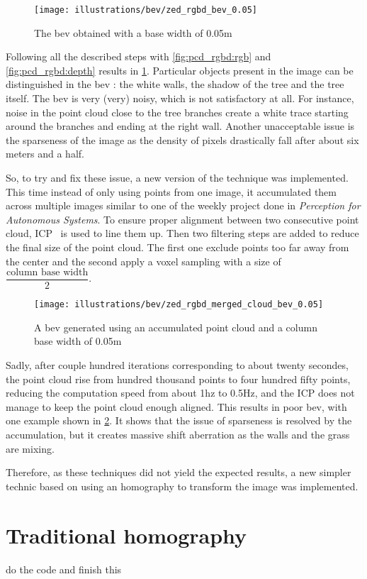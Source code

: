 \begin{figure}[ht!]
    \centering
    \texttt{[image: illustrations/bev/zed\_rgbd\_bev\_0.05]}
    \caption{The \gls{bev} obtained with a base width of 0.05m}
    \label{fig:pcd_rgbd:bev_0.05}
\end{figure}

Following all the described steps with \cref{fig:pcd_rgbd:rgb} and \cref{fig:pcd_rgbd:depth} results in \cref{fig:pcd_rgbd:bev_0.05}.
Particular objects present in the image can be distinguished in the bev : the white walls, the shadow of the tree and the tree itself.
The \gls{bev} is very (very) noisy, which is not satisfactory at all.
For instance, noise in the point cloud close to the tree branches create a white trace starting around the branches and ending at the right wall.
Another unacceptable issue is the sparseness of the image as the density of pixels drastically fall after about six meters and a half.

So, to try and fix these issue, a new version of the technique was implemented.
This time instead of only using points from one image, it accumulated them across multiple images similar to one of the weekly project
done in \textit{Perception for Autonomous Systems}. %
To ensure proper alignment between two consecutive point cloud, ICP~\parencite{besl_method_1992} is used to line them up.
Then two filtering steps are added to reduce the final size of the point cloud.
The first one exclude points too far away from the center and the second apply a voxel sampling with a size of $\dfrac{\text{column base width}}{2}$.

\begin{figure}[ht!]
    \centering
    \texttt{[image: illustrations/bev/zed\_rgbd\_merged\_cloud\_bev\_0.05]} %
    \caption{A \gls{bev} generated using an accumulated point cloud and a column base width of 0.05m}
    \label{fig:pcd_rgbd:accumulated_bev_0.05}
\end{figure}

Sadly, after couple hundred iterations corresponding to about twenty secondes, the point cloud rise from hundred
thousand points to four hundred fifty points, reducing the computation speed from about 1hz to 0.5Hz, and the ICP does not
manage to keep the point cloud enough aligned.
This results in poor \gls{bev}, with one example shown in \cref{fig:pcd_rgbd:accumulated_bev_0.05}.
It shows that the issue of sparseness is resolved by the accumulation, but it creates massive shift aberration as the walls and
the grass are mixing.

Therefore, as these techniques did not yield the expected results, a new simpler technic based on using an homography to
transform the image was implemented.


\section{Traditional homography}


do the code and finish this